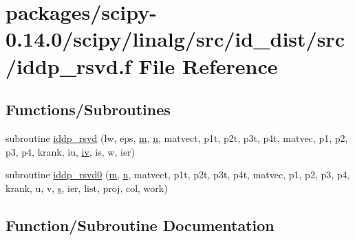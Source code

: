 \hypertarget{iddp__rsvd_8f}{}\section{packages/scipy-\/0.14.0/scipy/linalg/src/id\+\_\+dist/src/iddp\+\_\+rsvd.f File Reference}
\label{iddp__rsvd_8f}
\subsection*{Functions/\+Subroutines}
\begin{DoxyCompactItemize}
\item 
subroutine \hyperlink{iddp__rsvd_8f_a64f315e03063448733c96fe306f8a301}{iddp\+\_\+rsvd} (lw, eps, \hyperlink{indexexpr_8h_ab72fdb4031d47b75ab26dd18a437bcdc}{m}, \hyperlink{indexexpr_8h_ab427e2e2b4d6cec55fa088ea2a692ace}{n}, matvect, p1t, p2t, p3t, p4t, matvec, p1, p2, p3, p4, krank, iu, \hyperlink{cephes_8h_ad4b28607832b258aa453374d01dfe8c5}{iv}, is, w, ier)
\item 
subroutine \hyperlink{iddp__rsvd_8f_af922fe9771f850087ea7ed6f0842ad74}{iddp\+\_\+rsvd0} (\hyperlink{indexexpr_8h_ab72fdb4031d47b75ab26dd18a437bcdc}{m}, \hyperlink{indexexpr_8h_ab427e2e2b4d6cec55fa088ea2a692ace}{n}, matvect, p1t, p2t, p3t, p4t, matvec, p1, p2, p3, p4, krank, u, v, \hyperlink{indexexpr_8h_ae024b0db549122b44c349ae28ec990dc}{s}, ier, list, proj, col, work)
\end{DoxyCompactItemize}


\subsection{Function/\+Subroutine Documentation}
\hypertarget{iddp__rsvd_8f_a64f315e03063448733c96fe306f8a301}{}

